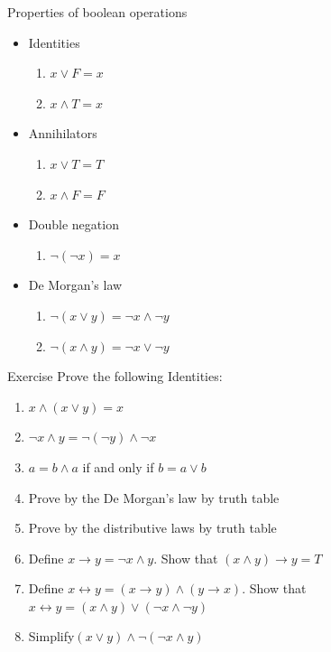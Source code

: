 \documentclass[10pt,xcolor={table,dvipsnames},t]{beamer}
\begin{document}
\begin{frame}{Properties of boolean operations}
  \begin{itemize}
    \item Identities
    \begin{enumerate}
      \item $x\lor F = x$
      \item $x \land T = x$
    \end{enumerate}
    \item Annihilators
    \begin{enumerate}
      \item $x\lor T = T$
      \item $x\land F = F$
    \end{enumerate}
    \item Double negation
    \begin{enumerate}
      \item $\neg (\neg x) = x $
    \end{enumerate}
    \item De Morgan's law
    \begin{enumerate}
      \item $\neg (x \lor y) = \neg x \land \neg y$
      \item $\neg (x \land y) = \neg x \lor \neg y$
    \end{enumerate}
  \end{itemize}
\end{frame}
\begin{frame}{Exercise}
  Prove the following Identities:
  \begin{enumerate}
    \item $x\land (x\lor y) = x$
    \item $\neg x \land y = \neg (\neg y) \land \neg x$
    \item $a = b \land a$ if and only if $b = a \lor b$
    \item Prove by the De Morgan's law by truth table
    \item Prove by the distributive laws by truth table
    \item Define $x\rightarrow y = \neg x \land y$. Show that $(x \land y) \rightarrow y = T$
    \item Define $x \leftrightarrow y = (x \rightarrow y) \land (y \rightarrow x)$. Show that $x\leftrightarrow y = (x\land y)\lor (\neg x \land \neg y)$ 
    \item Simplify$(x \lor y) \land \neg (\neg x \land y)$ 
  \end{enumerate}
\end{frame}
\end{document}
